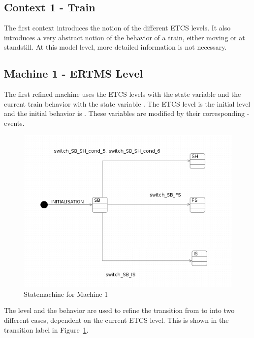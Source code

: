 \documentclass{template/openetcs_article}
\begin{document}


\subsection{Context 1 - Train}
\label{sec:context-1-train}

The first context introduces the notion of the different ETCS levels. It also
introduces a very abstract notion of the behavior of a train, either moving or
at standstill. At this model level, more detailed information is not necessary.



\subsection{Machine 1 - ERTMS Level}
\label{sec:machine-1-ertms}

The first refined machine uses the ETCS levels with the state variable
 and the current train behavior with the state variable
. The ETCS level  is the initial level and
the initial behavior is . These variables are modified by
their corresponding -events.

\begin{figure}[ht]
  \centering
  \includegraphics[width=.75\textwidth]{statechart2}
  \caption{Statemachine for Machine 1}
  \label{fig:statemachine-m1}
\end{figure}

The level and the behavior are used to refine the transition from  to
 into two different cases, dependent on the current ETCS level. This is
shown in the transition label in Figure~\ref{fig:statemachine-m1}.


\end{document}
